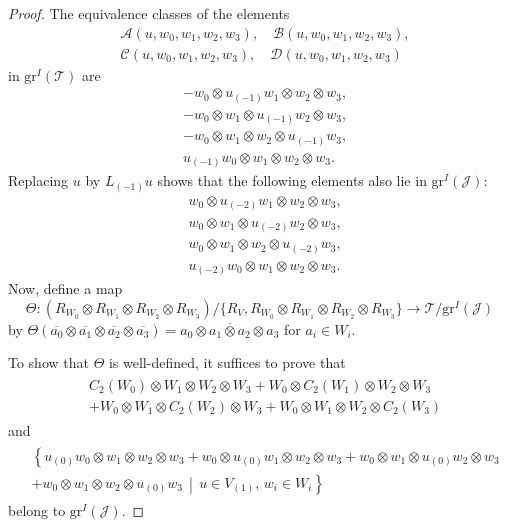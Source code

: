 \documentclass[9pt]{amsart}
\newcommand{\T}{\mathcal{T}}
\newcommand{\J}{\mathcal{J}}
\begin{document}
\begin{proof}
The equivalence classes of the elements
\[
\begin{split}
&\mathcal{A}(u, w_0, w_1, w_2, w_3),\quad \mathcal{B}(u, w_0, w_1, w_2, w_3),\\
&\mathcal{C}(u, w_0, w_1, w_2, w_3),\quad \mathcal{D}(u, w_0, w_1, w_2, w_3)
\end{split}
\]
in $\mathrm{gr}^I(\T)$ are
\begin{align*}
& -w_0 \otimes u_{(-1)} w_1 \otimes w_2 \otimes w_3, \\
& -w_0 \otimes w_1 \otimes u_{(-1)} w_2 \otimes w_3, \\
& -w_0 \otimes w_1 \otimes w_2 \otimes u_{(-1)} w_3, \\
& u_{(-1)} w_0 \otimes w_1 \otimes w_2 \otimes w_3.
\end{align*}
Replacing $u$ by $L_{(-1)} u$ shows that the following elements also lie in $\mathrm{gr}^I(\mathcal{J})$:
\begin{align*}
& w_0 \otimes u_{(-2)} w_1 \otimes w_2 \otimes w_3, \\
& w_0 \otimes w_1 \otimes u_{(-2)} w_2 \otimes w_3, \\
& w_0 \otimes w_1 \otimes w_2 \otimes u_{(-2)} w_3, \\
& u_{(-2)} w_0 \otimes w_1 \otimes w_2 \otimes w_3.
\end{align*}
Now, define a map
\[
\Theta: \left( R_{W_0} \otimes R_{W_1} \otimes R_{W_2} \otimes R_{W_3} \right) \big/ \{ R_V, R_{W_0} \otimes R_{W_1} \otimes R_{W_2} \otimes R_{W_3} \} \longrightarrow \T / \mathrm{gr}^I(\J)
\]
by $\Theta(\overline{a_0} \otimes \overline{a_1} \otimes \overline{a_2} \otimes \overline{a_3}) = \overline{a_0 \otimes a_1 \otimes a_2 \otimes a_3}$ for $a_i \in W_i$.

To show that $\Theta$ is well-defined, it suffices to prove that
\begin{align}\label{genus01}
\begin{split}
& C_2(W_0) \otimes W_1 \otimes W_2 \otimes W_3 + W_0 \otimes C_2(W_1) \otimes W_2 \otimes W_3 \\
& + W_0 \otimes W_1 \otimes C_2(W_2) \otimes W_3 + W_0 \otimes W_1 \otimes W_2 \otimes C_2(W_3)
\end{split}
\end{align}
and
\begin{align}\label{genus02}
\begin{split}
& \left\{ u_{(0)} w_0 \otimes w_1 \otimes w_2 \otimes w_3 + w_0 \otimes u_{(0)} w_1 \otimes w_2 \otimes w_3 + w_0 \otimes w_1 \otimes u_{(0)} w_2 \otimes w_3 \right. \\
& \left. + w_0 \otimes w_1 \otimes w_2 \otimes u_{(0)} w_3 \,\middle|\, u \in V_{(1)},\, w_i \in W_i \right\}
\end{split}
\end{align}
belong to $\mathrm{gr}^I(\J)$.


\end{proof}
\end{document}
